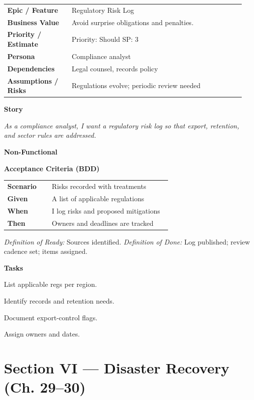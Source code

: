 \documentclass[11pt,letterpaper]{article}
\makeatletter
\newenvironment{kvtable}{%
  \par\noindent\begin{tabular}{@{}>{\raggedright\bfseries\arraybackslash}p{0.26\linewidth} >{\raggedright\arraybackslash}p{0.70\linewidth}@{}}
}{\end{tabular}\par}
\newenvironment{bdd}{%
  \par\noindent\begin{tabular}{@{}>{\raggedright\bfseries\arraybackslash}p{0.26\linewidth} >{\raggedright\arraybackslash}p{0.70\linewidth}@{}}
}{\end{tabular}\par}
\newcommand{\DoRDoD}[2]{%
  \vspace{0.35em}
  {\footnotesize\color{Muted}%
    \textit{Definition of Ready:} #1 \; \textbullet\;
    \textit{Definition of Done:} #2%
  }%
}
\newenvironment{storycard}[2]{%
  \begin{tcolorbox}[cloudcard, title={#1 --- #2}]%
}{\end{tcolorbox}}
\newcommand{\sectionlabel}[1]{\par\vspace{0.35em}\textbf{#1}\par}
\makeatother
\begin{document}
\begin{storycard}{CCS-28}{Ch. 28 — Government Regulations \& Compliance Risks}
\begin{kvtable}
Epic / Feature & Regulatory Risk Log\\
Business Value & Avoid surprise obligations and penalties.\\
Priority / Estimate & Priority: Should \quad SP: 3\\
Persona & Compliance analyst\\
Dependencies & Legal counsel, records policy\\
Assumptions / Risks & Regulations evolve; periodic review needed\\
\end{kvtable}
\sectionlabel{Story}
\textit{As a compliance analyst, I want a regulatory risk log so that export, retention, and sector rules are addressed.}
\sectionlabel{Non-Functional}\;
\sectionlabel{Acceptance Criteria (BDD)}
\begin{bdd}
Scenario & Risks recorded with treatments\\
Given & A list of applicable regulations\\
When & I log risks and proposed mitigations\\
Then & Owners and deadlines are tracked\\
\end{bdd}
\DoRDoD{Sources identified.}{Log published; review cadence set; items assigned.}
\sectionlabel{Tasks}
\begin{checklist}
\item List applicable regs per region.
\item Identify records and retention needs.
\item Document export-control flags.
\item Assign owners and dates.
\end{checklist}
\end{storycard}

\section{Section VI — Disaster Recovery (Ch. 29--30)}
\end{document}
